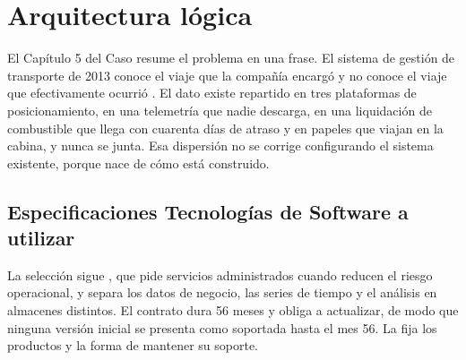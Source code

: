 \section{Arquitectura lógica}\label{sec:4-logica}

El Capítulo 5 del Caso resume el problema en una frase. El sistema de gestión de transporte de 2013
conoce el viaje que la compañía encargó y no conoce el viaje que efectivamente ocurrió
. El dato existe repartido en tres plataformas de posicionamiento, en una
telemetría que nadie descarga, en una liquidación de combustible que llega con cuarenta días de
atraso y en papeles que viajan en la cabina, y nunca se junta. Esa dispersión no se corrige
configurando el sistema existente, porque nace de cómo está construido.

\subsection{Especificaciones Tecnologías de Software a utilizar}\label{sec:4-software}

La selección sigue , que pide servicios administrados cuando reducen el riesgo
operacional, y separa los datos de negocio, las series de tiempo y el análisis en almacenes
distintos. El contrato dura 56 meses y obliga a actualizar, de modo que ninguna versión inicial se
presenta como soportada hasta el mes 56. La  fija los productos y la forma de
mantener su soporte.

